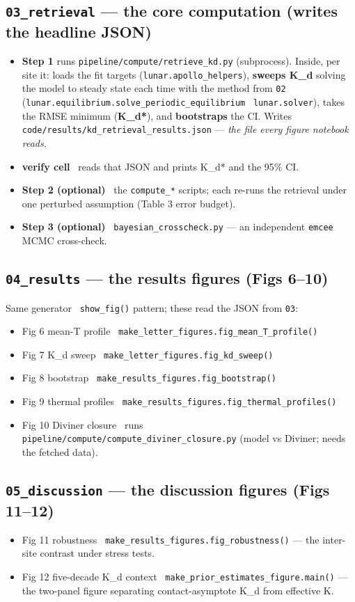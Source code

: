 \documentclass[11pt]{article}
\newcommand{\code}[1]{\texttt{\small #1}}
\newcommand{\fn}[1]{\texttt{\small\color{coral}#1}}
\newcommand{\arr}{\textrightarrow}
\newcommand{\nb}[1]{\texttt{\small\color{forest}#1}}
\begin{document}
\subsection{\nb{03\_retrieval} --- the core computation (writes the headline JSON)}
\begin{itemize}
\item \textbf{Step 1} runs \fn{pipeline/compute/retrieve\_kd.py} (subprocess). Inside, per site it: loads the fit targets (\code{lunar.apollo\_helpers}), \textbf{sweeps K\_d} solving the model to steady state each time with the method from \nb{02} (\code{lunar.equilibrium.solve\_periodic\_equilibrium} \arr\ \code{lunar.solver}), takes the RMSE minimum (\textbf{K\_d*}), and \textbf{bootstraps} the CI. Writes \code{code/results/kd\_retrieval\_results.json} --- \emph{the file every figure notebook reads.}
\item \textbf{verify cell} \arr\ reads that JSON and prints K\_d* and the 95\% CI.
\item \textbf{Step 2 (optional)} \arr\ the \code{compute\_*} scripts; each re-runs the retrieval under one perturbed assumption (Table 3 error budget).
\item \textbf{Step 3 (optional)} \arr\ \fn{bayesian\_crosscheck.py} --- an independent \code{emcee} MCMC cross-check.
\end{itemize}

\subsection{\nb{04\_results} --- the results figures (Figs 6--10)}
Same generator \arr\ \code{show\_fig()} pattern; these read the JSON from \nb{03}:
\begin{itemize}
\item Fig 6 mean-T profile \arr\ \fn{make\_letter\_figures.fig\_mean\_T\_profile()}
\item Fig 7 K\_d sweep \arr\ \fn{make\_letter\_figures.fig\_kd\_sweep()}
\item Fig 8 bootstrap \arr\ \fn{make\_results\_figures.fig\_bootstrap()}
\item Fig 9 thermal profiles \arr\ \fn{make\_results\_figures.fig\_thermal\_profiles()}
\item Fig 10 Diviner closure \arr\ runs \fn{pipeline/compute/compute\_diviner\_closure.py} (model vs Diviner; needs the fetched data).
\end{itemize}

\subsection{\nb{05\_discussion} --- the discussion figures (Figs 11--12)}
\begin{itemize}
\item Fig 11 robustness \arr\ \fn{make\_results\_figures.fig\_robustness()} --- the inter-site contrast under stress tests.
\item Fig 12 five-decade K\_d context \arr\ \fn{make\_prior\_estimates\_figure.main()} --- the two-panel figure separating contact-asymptote K\_d from effective K.
\end{itemize}
\end{document}
